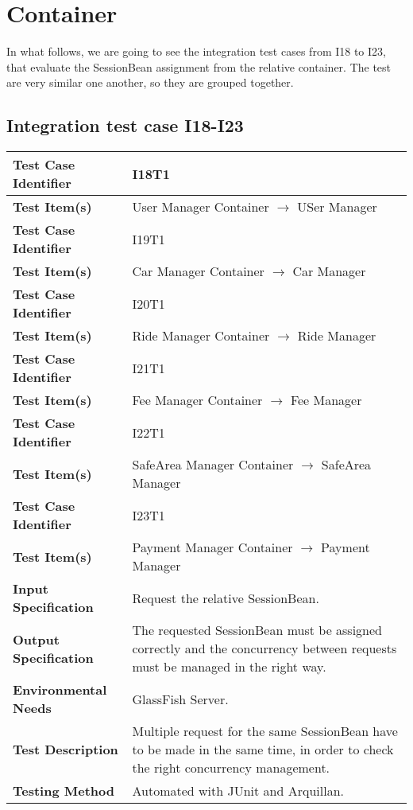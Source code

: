 \section{Container}

In what follows, we are going to see the integration test cases from I18 to I23, that evaluate the SessionBean assignment from the relative container. The test are very similar one another, so they are grouped together.

\subsection{Integration test case I18-I23}

\begin{tabular}{l p{}}
    \hline
    \textbf{Test Case Identifier} & I18T1\\
    \hline
    \textbf{Test Item(s)} & User Manager Container $\rightarrow$ USer Manager \\
    \hline
    \hline
    \textbf{Test Case Identifier} & I19T1\\
    \hline
    \textbf{Test Item(s)} & Car Manager Container $\rightarrow$ Car Manager \\
    \hline
    \hline
    \textbf{Test Case Identifier} & I20T1\\
    \hline
    \textbf{Test Item(s)} & Ride Manager Container $\rightarrow$ Ride Manager \\
    \hline
    \hline
    \textbf{Test Case Identifier} & I21T1\\
    \hline
    \textbf{Test Item(s)} & Fee Manager Container $\rightarrow$ Fee Manager \\
    \hline
    \hline
    \textbf{Test Case Identifier} & I22T1\\
    \hline
    \textbf{Test Item(s)} & SafeArea Manager Container $\rightarrow$ SafeArea Manager \\
    \hline
    \hline
    \textbf{Test Case Identifier} & I23T1\\
    \hline
    \textbf{Test Item(s)} & Payment Manager Container $\rightarrow$ Payment Manager \\
    \hline
    \hline
    \textbf{Input Specification} & Request the relative SessionBean. \\
    \hline
    \textbf{Output Specification} & The requested SessionBean must be assigned correctly and the concurrency between requests must be managed in the right way. \\
    \hline
    \textbf{Environmental Needs} & GlassFish Server.\\
    \hline
    \textbf{Test Description} & Multiple request for the same SessionBean have to be made in the same time, in order to check the right concurrency management.\\
    \hline
    \textbf{Testing Method} & Automated with JUnit and Arquillan. \\
    \hline
\end{tabular}